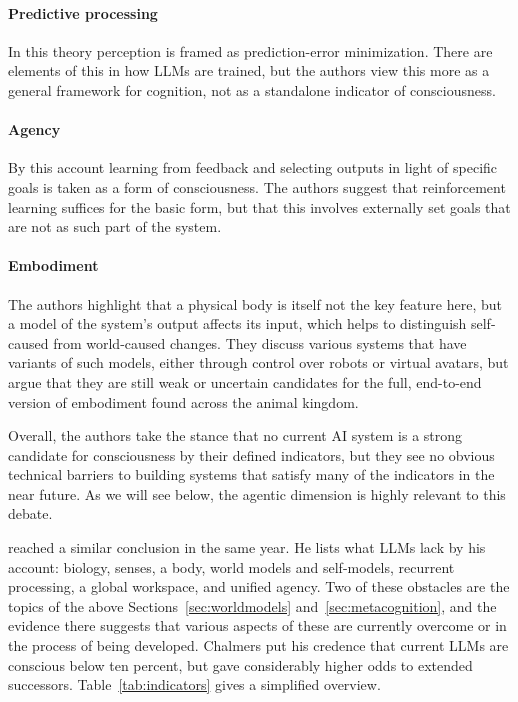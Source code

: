 \paragraph{Predictive processing} In this theory perception is framed as prediction-error minimization. There are elements of this in how LLMs are trained, but the authors view this more as a general framework for cognition, not as a standalone indicator of consciousness.

\paragraph{Agency} By this account learning from feedback and selecting outputs in light of specific goals is taken as a form of consciousness. The authors suggest that reinforcement learning suffices for the basic form, but that this involves externally set goals that are not as such part of the system. 

\paragraph{Embodiment} The authors highlight that a physical body is itself not the key feature here, but a model of the system's output affects its input, which helps to distinguish self-caused from world-caused changes. They discuss various systems that have variants of such models, either through control over robots or virtual avatars, but argue that they are still weak or uncertain candidates for the full, end-to-end version of embodiment found across the animal kingdom. 

Overall, the authors take the stance that no current AI system is a strong candidate for consciousness by their defined indicators, but they see no obvious technical barriers to building systems that satisfy many of the indicators in the near future. As we will see below, the agentic dimension is highly relevant to this debate.

\citet{chalmers2023could} reached a similar conclusion in the same year. He lists what LLMs lack by his account: biology, senses, a body, world models and self-models, recurrent processing, a global workspace, and unified agency. Two of these obstacles are the topics of the above Sections~\ref{sec:worldmodels} and~\ref{sec:metacognition}, and the evidence there suggests that various aspects of these are currently overcome or in the process of being developed. Chalmers put his credence that current LLMs are conscious below ten percent, but gave considerably higher odds to extended successors. Table~\ref{tab:indicators} gives a simplified overview.

